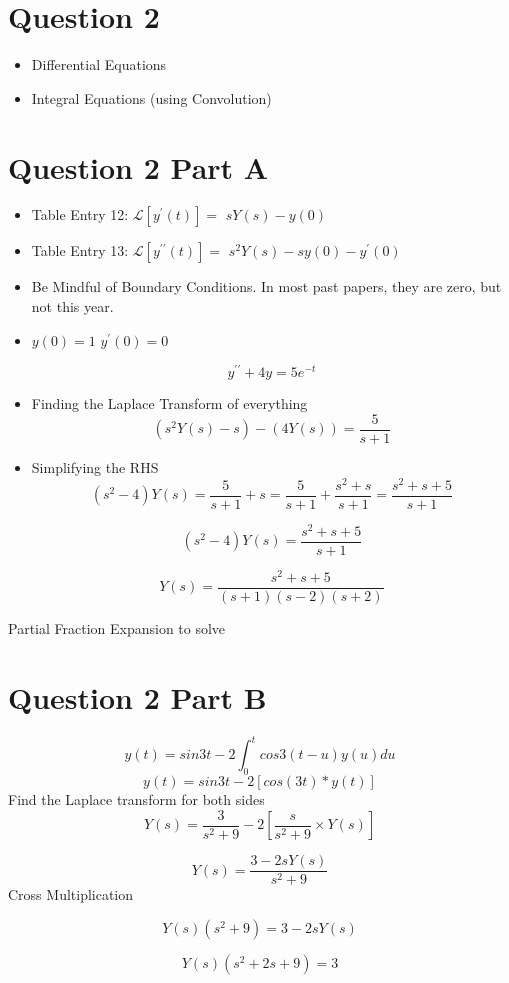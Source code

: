 \documentclass[11pt,a4paper,titlepage,oneside,openany]{article}
\numberwithin{equation}{section}
\numberwithin{algorithm}{section}
\numberwithin{figure}{section}
\numberwithin{table}{section}
\begin{document}
\section*{Question 2}
\begin{itemize}
\item Differential Equations
\item Integral Equations (using Convolution)
\end{itemize}
\section*{Question 2 Part A}
\begin{itemize}
\item Table Entry 12: $ \mathcal{L}[y^{\prime}(t)]=$ $sY(s)- y(0)$
\item Table Entry 13: $ \mathcal{L}[y^{\prime\prime}(t)]=$ $s^2Y(s)- sy(0) - y^{\prime}(0)$
\item Be Mindful of Boundary Conditions. In most past papers, they are zero, but not this year.
\item $y(0) = 1$ $y^{\prime}(0) = 0$

\[ y^{\prime\prime} +4y = 5e^{-t} \]

\item Finding the Laplace Transform of everything
\[(s^2Y(s)- s) - (4Y(s)) = \frac{5}{s+1} \]

\item Simplifying the RHS
\[(s^2-4)Y(s) = \frac{5}{s+1} + s  = \frac{5}{s+1} + \frac{s^2+s}{s+1} = \frac{s^2+s +5}{s+1} \]

\[(s^2-4)Y(s) = \frac{s^2+s +5}{s+1} \]

\[Y(s) = \frac{s^2+s +5}{(s+1)(s-2)(s+2)} \]
\end{itemize}
Partial Fraction Expansion to solve
\section*{Question 2 Part B}
\[ y(t) = sin 3t - 2\int^t_0 cos 3(t-u)y(u)du\]
\[ y(t) = sin 3t - 2\left[cos(3t)\ast y(t)\right]\]
Find the Laplace transform for both sides
\[ Y(s) = \frac{3}{s^2+9} - 2\left[\frac{s}{s^2+9} \times  Y(s)\right]\]

\[ Y(s) = \frac{3-2sY(s)}{s^2+9} \]
Cross Multiplication

\[ Y(s)(s^2+9) = 3-2sY(s) \]

\[ Y(s)(s^2+2s+9) = 3 \]
\end{document}
